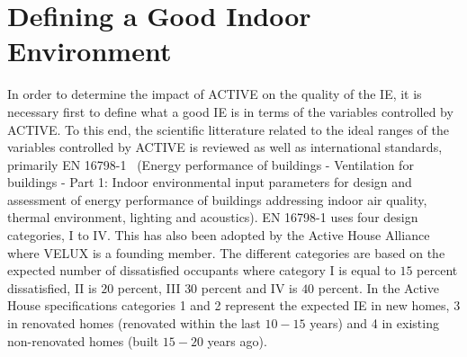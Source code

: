 \documentclass[fleqn,usenatbib,nofootinbib]{revtex4-2}
\begin{document}
	\section{Defining a Good Indoor Environment}
	\label{sec:rev}
	In order to determine the impact of ACTIVE on the quality of the IE, it is necessary first to define what a good IE is in terms of the variables controlled by ACTIVE. To this end, the scientific litterature related to the ideal ranges of the variables controlled by ACTIVE is reviewed as well as international standards, primarily EN 16798-1~\citep{EN16798-1} (Energy performance of buildings - Ventilation for buildings - Part 1: Indoor environmental input parameters for design and assessment of energy performance of buildings addressing indoor air quality, thermal environment, lighting and acoustics). EN 16798-1 uses four design categories, I to IV. This has also been adopted by the Active House Alliance where VELUX is a founding member. The different categories are based on the expected number of dissatisfied occupants where category I is equal to $15$ percent dissatisfied, II is $20$ percent, III $30$ percent and IV is $40$ percent. In the Active House specifications categories 1 and 2 represent the expected IE in new homes, 3 in renovated homes (renovated within the last $10-15$ years) and 4 in existing non-renovated homes (built $15-20$ years ago).

	
\end{document}
